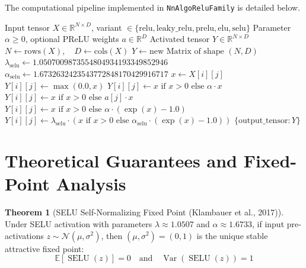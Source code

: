 \documentclass[11pt,a4paper]{article}
\theoremstyle{definition}
\newtheorem{theorem}{Theorem}[section]
\begin{document}
The computational pipeline implemented in \texttt{NnAlgoReluFamily} is detailed below.

\begin{algorithm}[H]
\caption{ReLU Family Forward Evaluation}
\begin{algorithmic}[1]
\Require Input tensor $X \in \mathbb{R}^{N \times D}$, variant $\in \{\text{relu}, \text{leaky\_relu}, \text{prelu}, \text{elu}, \text{selu}\}$
\Require Parameter $\alpha \ge 0$, optional PReLU weights $a \in \mathbb{R}^D$
\Ensure Activated tensor $Y \in \mathbb{R}^{N \times D}$
\State $N \gets \text{rows}(X), \quad D \gets \text{cols}(X)$
\State $Y \gets \text{new Matrix of shape } (N, D)$
\State $\lambda_{\text{selu}} \gets 1.0507009873554804934193349852946$
\State $\alpha_{\text{selu}} \gets 1.6732632423543772848170429916717$
        \State $x \gets X[i][j]$
            \State $Y[i][j] \gets \max(0.0, x)$
            \State $Y[i][j] \gets x \text{ if } x > 0 \text{ else } \alpha \cdot x$
            \State $Y[i][j] \gets x \text{ if } x > 0 \text{ else } a[j] \cdot x$
            \State $Y[i][j] \gets x \text{ if } x > 0 \text{ else } \alpha \cdot (\exp(x) - 1.0)$
            \State $Y[i][j] \gets \lambda_{\text{selu}} \cdot (x \text{ if } x > 0 \text{ else } \alpha_{\text{selu}} \cdot (\exp(x) - 1.0))$
        \EndIf
    \EndFor
\EndFor
\State \Return $\{\text{output\_tensor}: Y\}$
\end{algorithmic}
\end{algorithm}

\section{Theoretical Guarantees and Fixed-Point Analysis}

\begin{theorem}[SELU Self-Normalizing Fixed Point (Klambauer et al., 2017)]
Under SELU activation with parameters $\lambda \approx 1.0507$ and $\alpha \approx 1.6733$, if input pre-activations $z \sim \mathcal{N}(\mu, \sigma^2)$, then $(\mu, \sigma^2) = (0, 1)$ is the unique stable attractive fixed point:
\begin{equation}
\mathbb{E}[\operatorname{SELU}(z)] = 0 \quad \text{and} \quad \operatorname{Var}(\operatorname{SELU}(z)) = 1
\end{equation}
\end{theorem}
\end{document}
